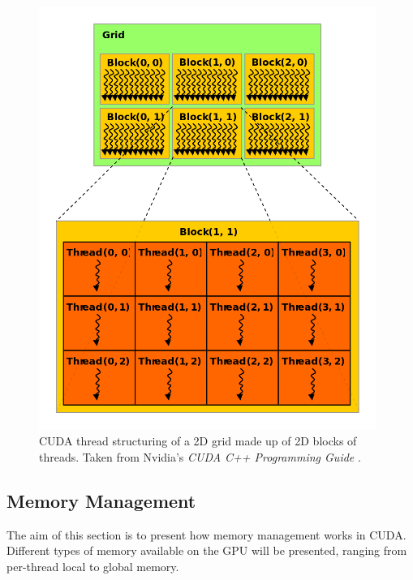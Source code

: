 \begin{figure}[ht!]
	\centering
	\includegraphics[width=11cm, keepaspectratio]{images/ch1/nvidia_grid_block_thread.png}
	\caption{CUDA thread structuring of a 2D grid made up of 2D blocks of threads. Taken from Nvidia's \emph{CUDA C++ Programming Guide} \cite{NVIDIAMay2022}.}
	\label{Figure:theory-CUDA-grid-block-thread}
\end{figure}


\subsection{Memory Management}\label{Subsection:memory-management}
The aim of this section is to present how memory management works in CUDA. Different types of memory available on the GPU will be presented, ranging from per-thread local to global memory.

